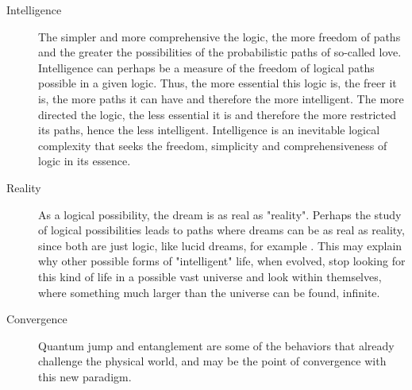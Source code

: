 \begin{description}
	   \item[Intelligence] The simpler and more comprehensive the logic, the more freedom of paths and the greater the possibilities of the probabilistic paths of so-called love. Intelligence can perhaps be a measure of the freedom of logical paths possible in a given logic. Thus, the more essential this logic is, the freer it is, the more paths it can have and therefore the more intelligent. The more directed the logic, the less essential it is and therefore the more restricted its paths, hence the less intelligent. Intelligence is an inevitable logical complexity that seeks the freedom, simplicity and comprehensiveness of logic in its essence.
	   \item[Reality] As a logical possibility, the dream is as real as "reality". Perhaps the study of logical possibilities leads to paths where dreams can be as real as reality, since both are just logic, like lucid dreams, for example \cite{lucid_dreams}.  This may explain why other possible forms of "intelligent" life, when evolved, stop looking for this kind of life in a possible vast universe and look within themselves, where something much larger than the universe can be found, infinite.
	   \item[Convergence] Quantum jump and entanglement are some of the behaviors that already challenge the physical world, and may be the point of convergence with this new paradigm.
	\end{description}